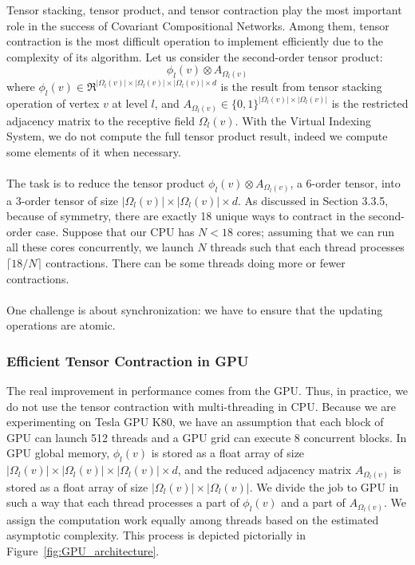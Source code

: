 \documentclass[a4paper]{article}
\begin{document}
Tensor stacking, tensor product, and tensor contraction play the most important role in the success of Covariant Compositional Networks. Among them, tensor contraction is the most difficult operation to implement efficiently due to the complexity of its algorithm. Let us consider the second-order tensor product:
$$\phi_l(v) \otimes A_{\Omega_l(v)}$$
where $\phi_l(v) \in \Re^{|\Omega_l(v)| \times |\Omega_l(v)| \times |\Omega_l(v)| \times d}$ is the result from tensor stacking operation of vertex $v$ at level $l$, and $A_{\Omega_l(v)} \in \{0, 1\}^{|\Omega_l(v)| \times |\Omega_l(v)|}$ is the restricted adjacency matrix to the receptive field $\Omega_l(v)$. With the Virtual Indexing System, we do not compute the full tensor product result, indeed we compute some elements of it when necessary. \\ \\
The task is to reduce the tensor product $\phi_l(v) \otimes A_{\Omega_l(v)}$, a 6-order tensor, into a 3-order tensor of size $|\Omega_l(v)| \times |\Omega_l(v)| \times d$. As discussed in Section 3.3.5, because of symmetry, there are exactly 18 unique ways to contract in the second-order case. Suppose that our CPU has $N < 18$ cores; assuming that we can run all these cores concurrently, we launch $N$ threads such that each thread processes $\lceil 18 / N \rceil$ contractions. There can be some threads doing more or fewer contractions. \\ \\
One challenge is about synchronization: we have to ensure that the updating operations are atomic.

\subsubsection{Efficient Tensor Contraction in GPU}

The real improvement in performance comes from the GPU. Thus, in practice, we do not use the tensor contraction with multi-threading in CPU. Because we are experimenting on Tesla GPU K80, we have an assumption that each block of GPU can launch 512 threads and a GPU grid can execute 8 concurrent blocks. In GPU global memory, $\phi_l(v)$ is stored as a float array of size $|\Omega_l(v)| \times |\Omega_l(v)| \times |\Omega_l(v)| \times d$, and the reduced adjacency matrix $A_{\Omega_l(v)}$ is stored as a float array of size $|\Omega_l(v)| \times |\Omega_l(v)|$. We divide the job to GPU in such a way that each thread processes a part of $\phi_l(v)$ and a part of $A_{\Omega_l(v)}$. We assign the computation work equally among threads based on the estimated asymptotic complexity. This process is depicted pictorially in Figure~\ref{fig:GPU_architecture}.
\end{document}
